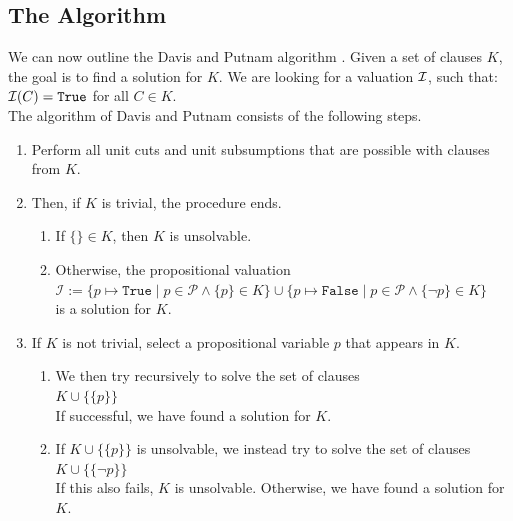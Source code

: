 \subsection{The Algorithm}
We can now outline the Davis and Putnam algorithm .
Given a set of clauses $K$, the goal is to find a solution for $K$. We
are looking for a valuation $\mathcal{I}$, such that: \\[0.2cm]
\hspace*{1.3cm} $\mathcal{I}(C) = \texttt{True}$ \quad for all $C \in K$.\\[0.2cm]
The algorithm of Davis and Putnam consists of the following steps.
\begin{enumerate}
\item Perform all unit cuts and unit subsumptions that are possible with clauses from $K$.
\item Then, if $K$ is trivial, the procedure ends.
     \begin{enumerate}
     \item If $\{\} \in K$, then $K$ is unsolvable.
     \item Otherwise, the propositional valuation
           \\[0.2cm]
           \hspace*{1.3cm}
           $\mathcal{I} := \bigl\{ p \mapsto \mathtt{True}  \mid p \in \mathcal{P} \wedge \{p\}\in K\bigr\} \cup
                           \bigl\{ p \mapsto \mathtt{False} \mid p \in \mathcal{P} \wedge \{\neg p\}\in K\bigr\}  $
           \\[0.2cm]
           is a solution for $K$.     
     \end{enumerate}
\item If $K$ is not trivial, select a propositional variable $p$ that appears in $K$.
      \begin{enumerate}
      \item We then try recursively to solve the set of clauses \\[0.2cm]
            \hspace*{1.3cm}  $K \cup \bigl\{\{p\}\bigr\}$ \\[0.2cm]
            If successful, we have found a solution for $K$.
      \item If $K \cup \bigl\{\{p\}\bigr\}$ is unsolvable, we instead try to solve the set of clauses
            \\[0.2cm] 
            \hspace*{1.3cm} $K \cup \bigl\{\{\neg p\}\bigr\}$
            \\[0.2cm]
            If this also fails, $K$ is unsolvable. Otherwise,
            we have found a solution for $K$.
      \end{enumerate}
\end{enumerate}
